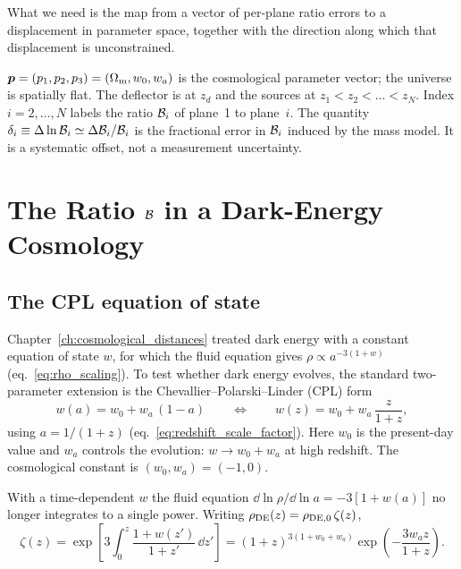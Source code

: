 What we need is the map from a vector of per-plane ratio errors
to a displacement in parameter space, together with the direction
along which that displacement is unconstrained.

\begin{keybox}
$\bm{p}=(p_1,p_2,p_3)=(\Omega_{\mathrm{m}},w_0,w_a)$ is the cosmological parameter
vector; the universe is spatially flat. The deflector is at $z_d$ and the
sources at $z_1<z_2<\dots<z_N$. Index $i=2,\dots,N$ labels the ratio
$\mathcal{B}_i$ of plane~1 to plane~$i$. The quantity
$\delta_i\equiv\Delta\ln\mathcal{B}_i\simeq\Delta\mathcal{B}_i/\mathcal{B}_i$ is the
fractional error in $\mathcal{B}_i$ induced by the mass model. It is a
systematic offset, not a measurement uncertainty.
\end{keybox}


\section{The Ratio $\mathcal{B}$ in a Dark-Energy Cosmology}
\label{sec:cs_cpl}

\subsection{The CPL equation of state}

Chapter~\ref{ch:cosmological_distances} treated dark energy with a
constant equation of state $w$, for which the fluid equation gives
$\rho\propto a^{-3(1+w)}$ (eq.~\ref{eq:rho_scaling}). To test whether
dark energy evolves, the standard two-parameter extension is the
Chevallier--Polarski--Linder (CPL) form
\citep{chevallier_polarski_2001,linder_2003}
\begin{equation}
  w(a)=w_0+w_a\,(1-a)
  \qquad\Longleftrightarrow\qquad
  w(z)=w_0+w_a\,\frac{z}{1+z},
  \label{eq:cs_cpl_w}
\end{equation}
using $a=1/(1+z)$ (eq.~\ref{eq:redshift_scale_factor}). Here $w_0$ is the
present-day value and $w_a$ controls the evolution: $w\to w_0+w_a$ at
high redshift. The cosmological constant is $(w_0,w_a)=(-1,0)$.

With a time-dependent $w$ the fluid equation
$\dd\ln\rho/\dd\ln a=-3[1+w(a)]$ no longer integrates to a single power.
Writing $\rho_{\rm DE}(z)=\rho_{\rm DE,0}\,\zeta(z)$,
\begin{equation}
  \zeta(z)=\exp\!\left[3\int_0^z\frac{1+w(z')}{1+z'}\,\dd z'\right]
  =(1+z)^{3(1+w_0+w_a)}\exp\!\left(-\frac{3w_az}{1+z}\right).
  \label{eq:cs_zeta}
\end{equation}

